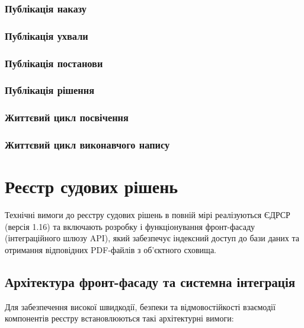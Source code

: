 \documentclass{article}
\begin{document}
\subsubsection{Публікація наказу}
\subsubsection{Публікація ухвали}
\subsubsection{Публікація постанови}
\subsubsection{Публікація рішення}
\subsubsection{Життєвий цикл посвічення}
\subsubsection{Життєвий цикл виконавчого напису}

\newpage
\section{Реєстр судових рішень}
Технічні вимоги до реєстру судових рішень в повній мірі реалізуються ЄДРСР (версія 1.16) та включають розробку і функціонування фронт-фасаду (інтеграційного шлюзу API), який забезпечує індексний доступ до бази даних та отримання відповідних PDF-файлів з об'єктного сховища.

\subsection{Архітектура фронт-фасаду та системна інтеграція}

Для забезпечення високої швидкодії, безпеки та відмовостійкості взаємодії компонентів реєстру встановлюються такі архітектурні вимоги:
\end{document}
